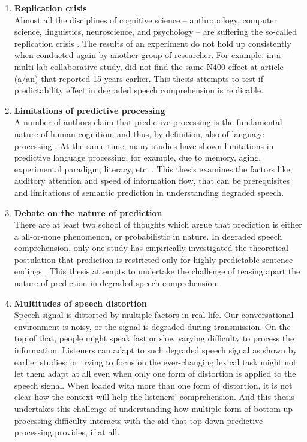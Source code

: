 \documentclass[a4paper, nobind]{templates/ociamthesis}
\begin{document}
\begin{enumerate}
\def\labelenumi{(\roman{enumi})}
\item
  \textbf{Replication crisis}\\
  Almost all the disciplines of cognitive science -- anthropology, computer science, linguistics, neuroscience, and psychology -- are suffering the so-called replication crisis \autocites[e.g.,][]{Sanderson2008,OSC2015,Ebersole2016,Cockburn2020}.
  The results of an experiment do not hold up consistently when conducted again by another group of researcher.
  For example, in a multi-lab collaborative study, \textcite{Nieuwland2020a} did not find the same N400 effect at article (a/an) that \textcite{Delong2005} reported 15 years earlier.
  This thesis attempts to test if predictability effect in degraded speech comprehension is replicable.
\item
  \textbf{Limitations of predictive processing}\\
  A number of authors claim that predictive processing is the fundamental nature of human cognition, and thus, by definition, also of language processing \autocite{Clark2013,Lupyan2015,Friston2020,Friston2020b}.
  At the same time, many studies have shown limitations in predictive language processing, for example, due to memory, aging, experimental paradigm, literacy, etc. \autocite{Federmeier2010,Mishra2012,Huettig2016,Huettig2019}.
  This thesis examines the factors like, auditory attention and speed of information flow, that can be prerequisites and limitations of semantic prediction in understanding degraded speech.
\item
  \textbf{Debate on the nature of prediction}\\
  There are at least two school of thoughts which argue that prediction is either a all-or-none phenomenon, or probabilistic in nature.
  In degraded speech comprehension, only one study has empirically investigated the theoretical postulation that prediction is restricted only for highly predictable sentence endings \autocite{Strauss2013}.
  This thesis attempts to undertake the challenge of teasing apart the nature of prediction in degraded speech comprehension.
\item
  \textbf{Multitudes of speech distortion}\\
  Speech signal is distorted by multiple factors in real life.
  Our conversational environment is noisy, or the signal is degraded during transmission.
  On the top of that, people might speak fast or slow varying difficulty to process the information.
  Listeners can adapt to such degraded speech signal as shown by earlier studies;
  or trying to focus on the ever-changing lexical task might not let them adapt at all even when only one form of distortion is applied to the speech signal.
  When loaded with more than one form of distortion, it is not clear how the context will help the listeners' comprehension.
  And this thesis undertakes this challenge of understanding how multiple form of bottom-up processing difficulty interacts with the aid that top-down predictive processing provides, if at all.
\end{enumerate}
\end{document}
